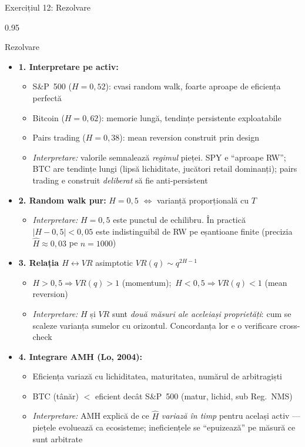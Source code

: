 \documentclass[9pt, aspectratio=169, t]{beamer}
\begin{document}
\begin{frame}[shrink=25]{Exercițiul 12: Rezolvare}
\begin{cminipage}{0.95\textwidth}
\begin{exampleblock}{Rezolvare}
\begin{itemize}\setlength{\itemsep}{0pt}
    \item \textbf{1. Interpretare pe activ:}
    \begin{itemize}\setlength{\itemsep}{0pt}
        \item S\&P~500 ($H = 0{,}52$): cvasi random walk, foarte aproape de eficiența perfectă
        \item Bitcoin ($H = 0{,}62$): memorie lungă, tendințe persistente exploatabile
        \item Pairs trading ($H = 0{,}38$): mean reversion construit prin design
        \item \textit{Interpretare:} valorile semnalează \emph{regimul} pieței. SPY e ``aproape RW''; BTC are tendințe lungi (lipsă lichiditate, jucători retail dominanți); pairs trading e construit \emph{deliberat} să fie anti-persistent
    \end{itemize}
    \item \textbf{2. Random walk pur:} $H = 0{,}5$ $\Leftrightarrow$ varianță proporțională cu $T$
    \begin{itemize}\setlength{\itemsep}{0pt}
        \item \textit{Interpretare:} $H = 0{,}5$ este punctul de echilibru. În practică $|H - 0{,}5| < 0{,}05$ este indistinguibil de RW pe eșantioane finite (precizia $\hat H \approx 0{,}03$ pe $n = 1000$)
    \end{itemize}
    \item \textbf{3. Relația $H \leftrightarrow VR$} \quad asimptotic $VR(q) \sim q^{2H-1}$
    \begin{itemize}\setlength{\itemsep}{0pt}
        \item $H > 0{,}5 \Rightarrow VR(q) > 1$ (momentum);\ $H < 0{,}5 \Rightarrow VR(q) < 1$ (mean reversion)
        \item \textit{Interpretare:} $H$ și $VR$ sunt \emph{două măsuri ale aceleiași proprietăți}: cum se scaleze varianța sumelor cu orizontul. Concordanța lor e o verificare cross-check
    \end{itemize}
    \item \textbf{4. Integrare AMH (Lo, 2004):}
    \begin{itemize}\setlength{\itemsep}{0pt}
        \item Eficiența variază cu lichiditatea, maturitatea, numărul de arbitragiști
        \item BTC (tânăr) $<$ eficient decât S\&P~500 (matur, lichid, sub Reg.\ NMS)
        \item \textit{Interpretare:} AMH explică de ce $\hat H$ \emph{variază în timp} pentru același activ --- piețele evoluează ca ecosisteme; ineficiențele se ``epuizează'' pe măsură ce sunt arbitrate
    \end{itemize}
\end{itemize}
\end{exampleblock}
\end{cminipage}
\end{frame}
\end{document}
